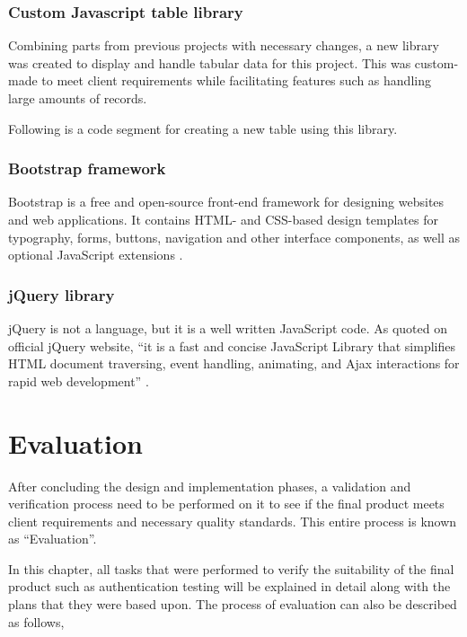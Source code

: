 \documentclass[12pt]{report}
\begin{document}
\subsection{Custom Javascript table library}
Combining parts from previous projects with necessary changes, a new library was created to display and handle tabular data for this project. This was custom-made to meet client requirements while facilitating features such as handling large amounts of records.

\noindent
Following is a code segment for creating a new table using this library.



\subsection{Bootstrap framework}
Bootstrap is a free and open-source front-end framework for designing
websites and web applications. It contains HTML- and CSS-based design templates for typography, forms, buttons, navigation and other interface components, as well as optional JavaScript extensions \cite{chahal_2019_bootstrap}.

\subsection{jQuery library}
jQuery is not a language, but it is a well written JavaScript code. As quoted on
official jQuery website, ``it is a fast and concise JavaScript Library that simplifies HTML document traversing, event handling, animating, and Ajax interactions for rapid web development'' \cite{chaffer_2007_jquery}.

\chapter{Evaluation}
After concluding the design and implementation phases, a validation and verification process need to be performed on it to see if the final product meets client requirements and necessary quality standards. This entire process is known as ``Evaluation''.

In this chapter, all tasks that were performed to verify the suitability of the final product such as authentication testing will be explained in detail along with the plans that they were based upon. The process of evaluation can also be described as follows,
\end{document}
